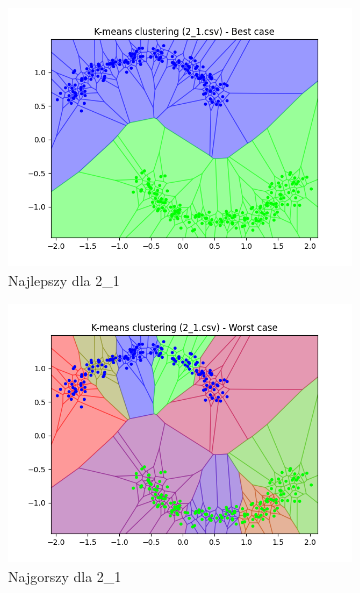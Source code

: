 \documentclass[12pt]{article}
\begin{document}
\begin{figure}[H]
\begin{subfigure}[b]{0.24\textwidth}
        \includegraphics[width=\linewidth]{img/exp_2/kmeans/2_1_best.png}
        \caption{Najlepszy dla 2\_1}
    \end{subfigure}
    \hfill
    \begin{subfigure}[b]{0.24\textwidth}
        \includegraphics[width=\linewidth]{img/exp_2/kmeans/2_1_worst.png}
        \caption{Najgorszy dla 2\_1}
    \end{subfigure}
    \begin{subfigure}[b]{0.24\textwidth}

\end{subfigure}
\end{figure}
\end{document}
